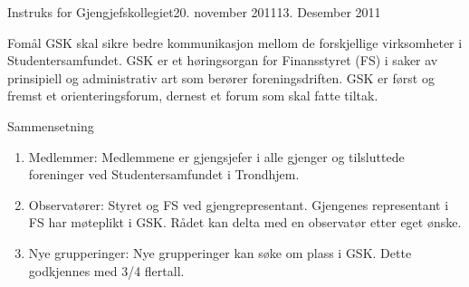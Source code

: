
\begin{instruks}{Instruks for Gjengjefskollegiet}{20. november 2011}{13. Desember 2011}

    \begin{instruksledd}{Fomål}
        GSK skal sikre bedre kommunikasjon mellom de forskjellige virksomheter i
        Studentersamfundet.
        GSK er et høringsorgan for Finansstyret (FS) i saker av prinsipiell og
        administrativ art som berører
        foreningsdriften. GSK er først og fremst et orienteringsforum, dernest et forum
        som skal fatte tiltak.
    \end{instruksledd}

    \begin{instruksledd}{Sammensetning}
        \begin{enumerate}
            \item Medlemmer:
                Medlemmene er gjengsjefer i alle gjenger og tilsluttede foreninger ved
                Studentersamfundet i Trondhjem.
            \item Observatører:
                Styret og FS ved gjengrepresentant. Gjengenes representant i FS har møteplikt i
                GSK. Rådet kan delta med
                en observatør etter eget ønske.
            \item Nye grupperinger:
                Nye grupperinger kan søke om plass i GSK. Dette godkjennes med 3/4 flertall.
        \end{enumerate}
    \end{instruksledd}


\end{instruks}
